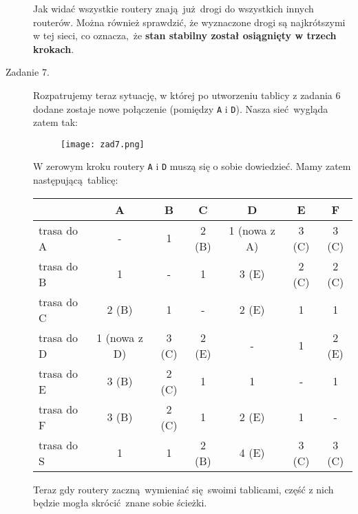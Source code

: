 \documentclass[a4paper, oneside]{article}
\begin{document}
\begin{description}
    Jak widać wszystkie routery znają już drogi do wszystkich innych routerów.
    Można również sprawdzić, że wyznaczone drogi są najkrótszymi w tej sieci,
    co oznacza, że \textbf{stan stabilny został osiągnięty w trzech krokach}.

    \item [Zadanie 7.] {
        Rozpatrujemy teraz sytuację, w której po utworzeniu tablicy z
        zadania 6 dodane zostaje nowe połączenie (pomiędzy \texttt{A} 
        i \texttt{D}). Nasza sieć wygląda zatem tak:

        \begin{figure}[H]
            \centering
            \texttt{[image: zad7.png]}
        \end{figure}

        W zerowym kroku routery \texttt{A} i \texttt{D} muszą się o sobie
        dowiedzieć. Mamy zatem następującą tablicę:

        \begin{table}[H]
        \centering
        \begin{tabular}{|l|c|c|c|c|c|c|}
        \hline
        & \textbf{A} & \textbf{B} 
        & \textbf{C} & \textbf{D} 
        & \textbf{E} & \textbf{F} \\ \hline\hline
        trasa do A & -     & 1     & 2 (B) & 1 \cellcolor{green!10}(nowa z A) & 3 (C) & 3 (C) \\ \hline
        trasa do B & 1     & -     & 1     & 3 (E) & 2 (C) & 2 (C) \\ \hline
        trasa do C & 2 (B) & 1     & -     & 2 (E) & 1     & 1     \\ \hline
        trasa do D & 1 \cellcolor{green!10}(nowa z D) & 3 (C) & 2 (E) & -     & 1     & 2 (E) \\ \hline
        trasa do E & 3 (B) & 2 (C) & 1     & 1     & -     & 1     \\ \hline
        trasa do F & 3 (B) & 2 (C) & 1     & 2 (E) & 1     & -     \\ \hline
        trasa do S & 1     & 1     & 2 (B) & 4 (E) & 3 (C) & 3 (C) \\ \hline
        \end{tabular}
        \end{table}

        Teraz gdy routery zaczną wymieniać się swoimi tablicami, część
        z nich będzie mogła skrócić znane sobie ścieżki.

}
\end{description}
\end{document}
